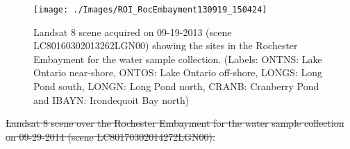 \documentclass[onecolumn,3p,letterpaper]{elsarticle}
\providecommand{\DIFdeltex}[1]{{\protect\color{red}\sout{#1}}}                      %
\providecommand{\DIFdelbegin}{} %
\providecommand{\DIFdelend}{} %
\providecommand{\DIFdelFL}[1]{\DIFdel{#1}} %
\providecommand{\DIFdel}[1]{\texorpdfstring{\DIFdeltex{#1}}{}} %
\begin{document}
\begin{figure}[htb]
  \centering
  \texttt{[image: ./Images/ROI\_RocEmbayment130919\_150424]}
  \caption{Landsat 8 scene acquired on 09-19-2013 (scene LC80160302013262LGN00) showing the sites in the Rochester Embayment for the water sample collection. (Labels: ONTNS: Lake Ontario near-shore, ONTOS: Lake Ontario off-shore, LONGS: Long Pond south, LONGN: Long Pond north, CRANB: Cranberry Pond and IBAYN: Irondequoit Bay north)\label{fig:091913Sites} } 
\end{figure}

\DIFdelbegin %
{%
\DIFdelFL{Landsat 8 scene over the Rochester Embayment for the water sample collection on 09-29-2014 (scene LC80170302014272LGN00).}%
} 
\DIFdelend %
\end{document}
